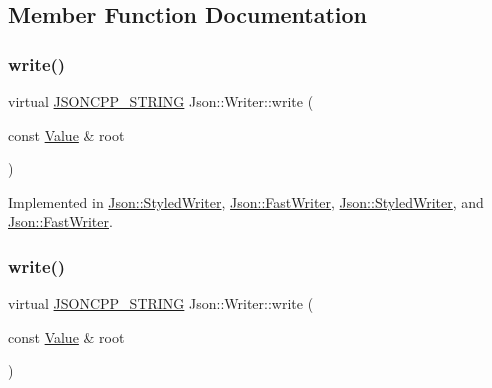 \subsection{Member Function Documentation}
\hypertarget{class_json_1_1_writer_a61c55882b82c7651d0b9b683c6d3f371}{}\label{class_json_1_1_writer_a61c55882b82c7651d0b9b683c6d3f371} 
\subsubsection{\texorpdfstring{write()}{write()}\hspace{0.1cm}{\footnotesize\ttfamily [1/2]}}
{\footnotesize\ttfamily virtual \hyperlink{config_8h_a1e723f95759de062585bc4a8fd3fa4be}{J\+S\+O\+N\+C\+P\+P\+\_\+\+S\+T\+R\+I\+NG} Json\+::\+Writer\+::write (\begin{DoxyParamCaption}\item[{const \hyperlink{class_json_1_1_value}{Value} \&}]{root }\end{DoxyParamCaption})\hspace{0.3cm}{\ttfamily [pure virtual]}}



Implemented in \hyperlink{class_json_1_1_styled_writer_a5efab19b9746da9920c29cdae3a6b404}{Json\+::\+Styled\+Writer}, \hyperlink{class_json_1_1_fast_writer_a93d45ba4bc312371d08beb3e3dfbe654}{Json\+::\+Fast\+Writer}, \hyperlink{class_json_1_1_styled_writer_a5efab19b9746da9920c29cdae3a6b404}{Json\+::\+Styled\+Writer}, and \hyperlink{class_json_1_1_fast_writer_a93d45ba4bc312371d08beb3e3dfbe654}{Json\+::\+Fast\+Writer}.

\hypertarget{class_json_1_1_writer_a61c55882b82c7651d0b9b683c6d3f371}{}\label{class_json_1_1_writer_a61c55882b82c7651d0b9b683c6d3f371} 
\subsubsection{\texorpdfstring{write()}{write()}\hspace{0.1cm}{\footnotesize\ttfamily [2/2]}}
{\footnotesize\ttfamily virtual \hyperlink{config_8h_a1e723f95759de062585bc4a8fd3fa4be}{J\+S\+O\+N\+C\+P\+P\+\_\+\+S\+T\+R\+I\+NG} Json\+::\+Writer\+::write (\begin{DoxyParamCaption}\item[{const \hyperlink{class_json_1_1_value}{Value} \&}]{root }\end{DoxyParamCaption})\hspace{0.3cm}{\ttfamily [pure virtual]}}



